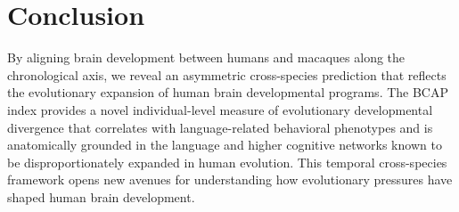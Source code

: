 \documentclass[12pt]{article}
\begin{document}
\section{Conclusion}

By aligning brain development between humans and macaques along the chronological axis, we reveal an asymmetric cross-species prediction that reflects the evolutionary expansion of human brain developmental programs. The BCAP index provides a novel individual-level measure of evolutionary developmental divergence that correlates with language-related behavioral phenotypes and is anatomically grounded in the language and higher cognitive networks known to be disproportionately expanded in human evolution. This temporal cross-species framework opens new avenues for understanding how evolutionary pressures have shaped human brain development.



\end{document}

